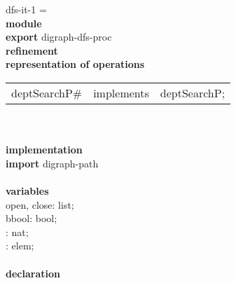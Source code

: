 \begin{tabbing}
dfs-it-1 = \\
{\bf mod}\={\bf ule}\+\\
{\bf export} digraph-dfs-proc\\
{\bf ref}\={\bf inement}\+\\
{\bf rep}\= {\bf resentation of operations}\+\\
\begin{tabular}{lcl}
deptSearchP\# & implements & deptSearchP;
\end{tabular}\-\\

\\
{\bf implementation}\\
{\bf import} digraph-path\\
\\
{\bf vari}\={\bf ables}\+\\
open, close: list;\\
bbool: bool;\\
: nat;\\
: elem;
\-\\
\\

               {\bf declaration}
\end{tabbing}

